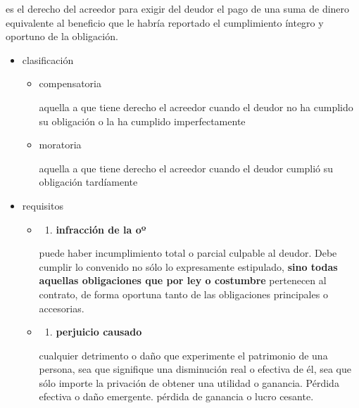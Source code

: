 \documentclass[]{article}
\providecommand{\tightlist}{%
  \setlength{\itemsep}{0pt}\setlength{\parskip}{0pt}}
\begin{document}
\begin{itemize}
\begin{itemize}
    es el derecho del acreedor para exigir del deudor el pago de una
    suma de dinero equivalente al beneficio que le habría reportado el
    cumplimiento íntegro y oportuno de la obligación.

    \begin{itemize}
    \item
      clasificación

      \begin{itemize}
      \item
        compensatoria

        aquella a que tiene derecho el acreedor cuando el deudor no ha
        cumplido su obligación o la ha cumplido imperfectamente
      \item
        moratoria

        aquella a que tiene derecho el acreedor cuando el deudor cumplió
        su obligación tardíamente
      \end{itemize}
    \item
      requisitos

      \begin{itemize}
      \item
        \begin{enumerate}
        \def\labelenumi{\alph{enumi})}
        \tightlist
        \item
          \textbf{infracción de la oº}
        \end{enumerate}

        puede haber incumplimiento total o parcial culpable al deudor.
        Debe cumplir lo convenido no sólo lo expresamente estipulado,
        \textbf{sino todas aquellas obligaciones que por ley o
        costumbre} pertenecen al contrato, de forma oportuna tanto de
        las obligaciones principales o accesorias.
      \item
        \begin{enumerate}
        \def\labelenumi{\alph{enumi})}
        \setcounter{enumi}{1}
        \tightlist
        \item
          \textbf{perjuicio causado}
        \end{enumerate}

        cualquier detrimento o daño que experimente el patrimonio de una
        persona, sea que signifique una disminución real o efectiva de
        él, sea que sólo importe la privación de obtener una utilidad o
        ganancia. Pérdida efectiva o daño emergente. pérdida de ganancia
        o lucro cesante.


\end{itemize}
\end{itemize}
\end{itemize}
\end{itemize}
\end{document}
